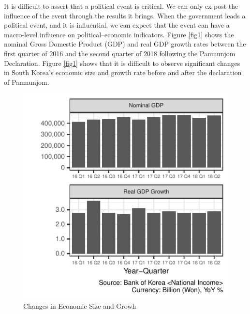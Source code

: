 \documentclass[letterpaper,9pt,twocolumn,twoside,]{pinp}
\begin{document}
It is difficult to assert that a political event is critical. We can
only ex-post the influence of the event through the results it brings.
When the government leads a political event, and it is influential, we
can expect that the event can have a macro-level influence on
political--economic indicators. Figure \ref{fig1} shows the nominal
Gross Domestic Product (GDP) and real GDP growth rates between the first
quarter of 2016 and the second quarter of 2018 following the Panmunjom
Declaration. Figure \ref{fig1} shows that it is difficult to observe
significant changes in South Korea's economic size and growth rate
before and after the declaration of Panmunjom.

\begin{figure}[htbp]

{\centering \includegraphics{manuscript_files/figure-latex/fig1-1} 

}

\caption{\label{fig1} Changes in Economic Size and Growh}\label{fig:fig1}
\end{figure}
\end{document}
